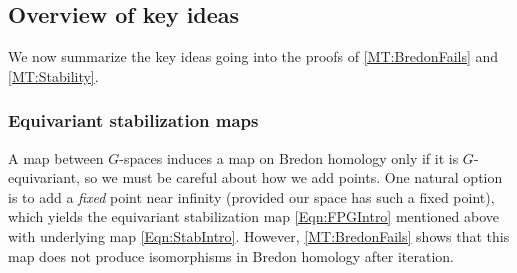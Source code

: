 \documentclass[11pt]{amsart}
\theoremstyle{definition}
\newtheorem{remark}[equation]{Remark}
\numberwithin{equation}{subsection} %
\def\ce{\mathcal{E}}
\begin{document}




\subsection{Overview of key ideas}

We now summarize the key ideas going into the proofs of \cref{MT:BredonFails} and \cref{MT:Stability}. 

\subsubsection{Equivariant stabilization maps}

A map between $G$-spaces induces a map on Bredon homology only if it is $G$-equivariant, so we must be careful about how we add points. One natural option is to add a \emph{fixed} point near infinity (provided our space has such a fixed point), which yields the equivariant stabilization map \eqref{Eqn:FPGIntro} mentioned above with underlying map \eqref{Eqn:StabIntro}. However, \cref{MT:BredonFails} shows that this map does not produce isomorphisms in Bredon homology after iteration. 
\end{document}
